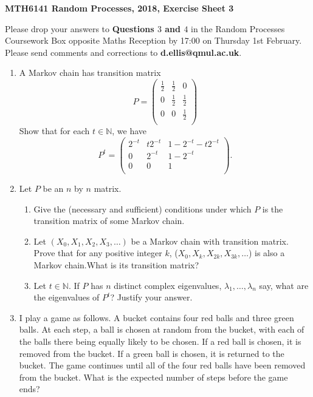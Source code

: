 \documentclass[11pt,a4paper]{report}
\begin{document}
    \large{\textbf{MTH6141 Random Processes, 2018, Exercise Sheet 3}}\par
    Please drop your answers to \textbf{Questions $3$ and $4$} in the Random Processes Coursework Box opposite Maths Reception by 17:00 on Thursday 1st February. Please send comments and corrections to \textbf{d.ellis@qmul.ac.uk}.
    \begin{enumerate}
        \item  A Markov chain has transition matrix
        $$P = \begin{pmatrix}
            \frac{1}{2} & \frac{1}{2} & 0\\
            0 & \frac{1}{2} & \frac{1}{2}\\
            0 & 0 & \frac{1}{2}\\
        \end{pmatrix}$$
        Show that for each $t\in \mathbb{N}$, we have
        $$
        P^t =
        \begin{pmatrix}
            2^{-t} & t2^{-t} & 1-2^{-t}-t2^{-t}\\
            0 & 2^{-t} & 1-2^{-t}\\
            0 & 0 & 1\\
        \end{pmatrix}.
        $$
        \item  Let $P$ be an $n$ by $n$ matrix.
        \begin{enumerate}
            \item Give the (necessary and sufficient) conditions under which $P$ is the transition matrix of some Markov chain.
            \item  Let $(X_0, X_1, X_2, X_3,\ldots)$ be a Markov chain with transition matrix. Prove that for any positive integer $k$, ($X_0, X_k, X_{2k}, X_{3k},\ldots$) is also a Markov chain.What is its transition matrix?
            \item Let $t \in \mathbb{N}$. If $P$ has $n$ distinct complex eigenvalues, $\lambda_1,\ldots,\lambda_n$ say, what are the eigenvalues of $P^t$? Justify your answer.            
        \end{enumerate}
        \item  I play a game as follows. A bucket contains four red balls and three green balls. At each step, a ball is chosen at random from the bucket, with each of the balls there being equally likely to be chosen. If a red ball is chosen, it is removed from the bucket. If a green ball is chosen, it is returned to the bucket. The game continues until all of the four red balls have been removed from the bucket. What is the expected number of steps before the game ends?

\end{enumerate}
\end{document}
